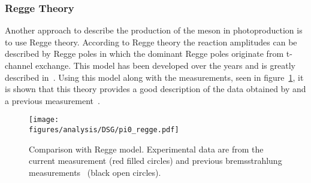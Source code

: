 \subsubsection{Regge Theory}
Another approach to describe the production of the \piz meson in photoproduction is to use Regge theory. According to Regge theory the reaction amplitudes can be described by Regge poles in which the dominant Regge poles originate from t-channel exchange. This model has been developed over the years and is greatly described in~\cite{JPAC}. Using this model along with the  measurements, seen in figure~\ref{fig:pi0_regge}, it is shown that this theory provides a good description of the data obtained by  and a previous measurement~\cite{brem}.
\begin{figure}[h]
	\centerline{\texttt{[image: \\figures/analysis/DSG/pi0\_regge.pdf]}}
	\caption{Comparison with Regge model. Experimental data are from the current measurement (red filled circles) and previous bremsstrahlung measurements~\protect\cite{brem} (black open circles). }
	\label{fig:pi0_regge}
\end{figure}